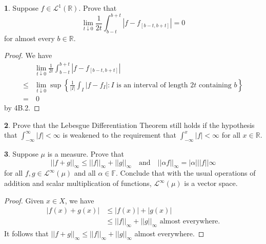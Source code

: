 \documentclass[12pt]{article}
\theoremstyle{definition}
\newtheorem{ex}{}
\newenvironment{exercise}[1]{
	\renewcommand{\theex}{#1}
	\begin{ex}
		}{\end{ex}}
\begin{document}
\begin{exercise}{4B.1}
	Suppose $f \in \mathcal{L}^1(\mathbb{R})$.
	Prove that \begin{equation*}
		\lim_{t \downarrow 0} \frac{1}{2t} \int_{b-t}^{b+t}|f - f_{[b-t, b+t]}| = 0
	\end{equation*}
	for almost every $b \in \mathbb{R}$.
\end{exercise}
\begin{proof}
	We have \begin{align*}
		     & \lim_{t \downarrow 0} \frac{1}{2t} \int_{b-t}^{b+t}|f - f_{[b-t, b+t]}|                                                                       \\
		\leq & \lim_{t \downarrow 0} \sup \left\lbrace \frac{1}{|I|} \int_I |f - f_I| : I \text{ is an interval of length $2t$ containing $b$} \right\rbrace \\
		=    & \ 0
	\end{align*}
	by 4B.2.
\end{proof}

\begin{exercise}{4B.4}
	Prove that the Lebesgue Differentiation Theorem still holds if the hypothesis that $\int_{-\infty}^\infty |f| < \infty$ is weakened to the requirement that $\int_{-\infty}^x |f| < \infty$ for all $x \in \mathbb{R}$.
\end{exercise}

\begin{exercise}{7A.1}
	Suppose $\mu$ is a measure.
	Prove that \begin{equation*}
		||f + g||_{\infty} \leq ||f||_{\infty} + ||g||_\infty \hspace{1em}\text{and}\hspace{1em} ||\alpha f||_\infty = |\alpha| ||f||\infty
	\end{equation*}
	for all $f, g \in \mathcal{L}^\infty(\mu)$ and all $\alpha \in \mathbb{F}$.
	Conclude that with the usual operations of addition and scalar multiplication of functions, $\mathcal{L}^\infty(\mu)$ is a vector space.
\end{exercise}
\begin{proof}
	Given $x \in X$, we have \begin{align*}
		|f(x) + g(x)| & \leq |f(x)| + |g(x)|                                        \\
		              & \leq ||f||_\infty + ||g||_\infty \text{ almost everywhere}.
	\end{align*}
	It follows that $||f + g||_\infty \leq ||f||_\infty + ||g||_\infty$ almost everywhere.
\end{proof}
\end{document}
